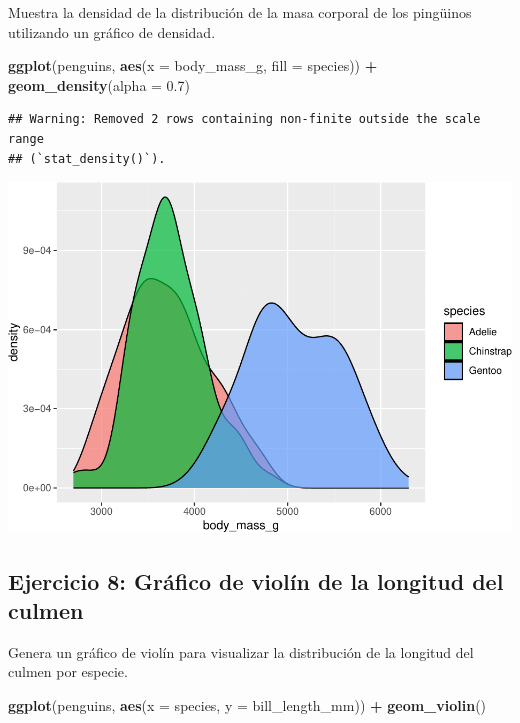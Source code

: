 \documentclass[
]{book}
\newenvironment{Shaded}{\begin{snugshade}}{\end{snugshade}}
\newcommand{\AttributeTok}[1]{\textcolor[rgb]{0.13,0.29,0.53}{#1}}
\newcommand{\FloatTok}[1]{\textcolor[rgb]{0.00,0.00,0.81}{#1}}
\newcommand{\FunctionTok}[1]{\textcolor[rgb]{0.13,0.29,0.53}{\textbf{#1}}}
\newcommand{\NormalTok}[1]{#1}
\newcommand{\SpecialCharTok}[1]{\textcolor[rgb]{0.81,0.36,0.00}{\textbf{#1}}}
\begin{document}
Muestra la densidad de la distribución de la masa corporal de los pingüinos utilizando un gráfico de densidad.

\begin{Shaded}
\begin{Highlighting}[]
\FunctionTok{ggplot}\NormalTok{(penguins, }\FunctionTok{aes}\NormalTok{(}\AttributeTok{x =}\NormalTok{ body\_mass\_g, }\AttributeTok{fill =}\NormalTok{ species)) }\SpecialCharTok{+}
  \FunctionTok{geom\_density}\NormalTok{(}\AttributeTok{alpha =} \FloatTok{0.7}\NormalTok{)}
\end{Highlighting}
\end{Shaded}

\begin{verbatim}
## Warning: Removed 2 rows containing non-finite outside the scale range
## (`stat_density()`).
\end{verbatim}

\includegraphics{bookdown-demo_files/figure-latex/unnamed-chunk-183-1.pdf}

\hypertarget{ejercicio-8-gruxe1fico-de-violuxedn-de-la-longitud-del-culmen}{%
\subsection{Ejercicio 8: Gráfico de violín de la longitud del culmen}\label{ejercicio-8-gruxe1fico-de-violuxedn-de-la-longitud-del-culmen}}

Genera un gráfico de violín para visualizar la distribución de la longitud del culmen por especie.

\begin{Shaded}
\begin{Highlighting}[]
\FunctionTok{ggplot}\NormalTok{(penguins, }\FunctionTok{aes}\NormalTok{(}\AttributeTok{x =}\NormalTok{ species, }\AttributeTok{y =}\NormalTok{ bill\_length\_mm)) }\SpecialCharTok{+}
  \FunctionTok{geom\_violin}\NormalTok{()}
\end{Highlighting}
\end{Shaded}
\end{document}
